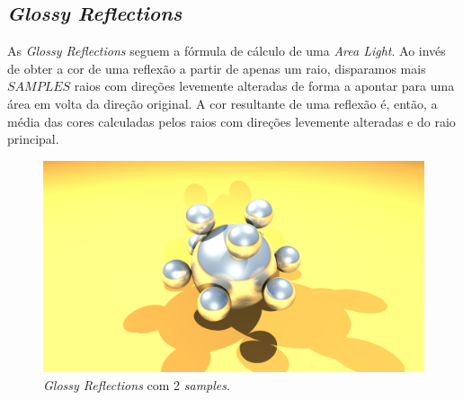 \documentclass{article}
\begin{document}
        \subsection*{\textit{Glossy Reflections}}  
            \par
	As \textit{Glossy Reflections} seguem a fórmula de cálculo de uma \textit{Area Light}. Ao invés de obter a cor de uma reflexão a partir de apenas um raio, disparamos mais ${SAMPLES}$ raios com direções levemente alteradas de forma a apontar para uma área em volta da direção original. A cor resultante de uma reflexão é, então, a média das cores calculadas pelos raios com direções levemente alteradas e do raio principal.
            \begin{figure}[h!]
                \centering
                \includegraphics[scale=0.122]{glrefl}
                \caption{\textit{Glossy Reflections} com 2 \textit{samples}.}
            \end{figure}
\end{document}
